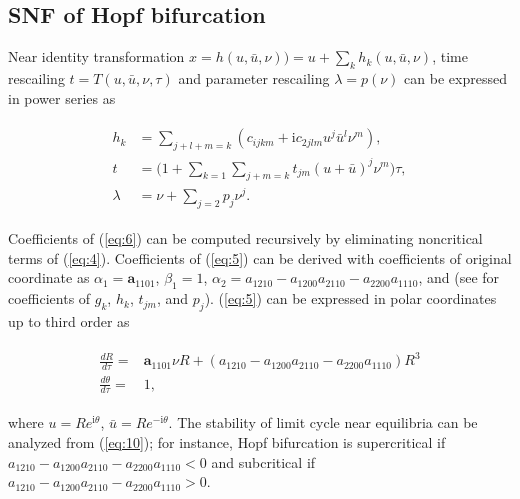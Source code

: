 \documentclass[openacc]{rsproca_new}%
\def\vec#1{\ensuremath{\mathbf{#1}}}
\newcommand{\Eref}[1]{(\ref{#1})}
\begin{document}
\begin{appendices}
\gdef\thesection{Appendix \Alph{section}}

\section{SNF of Hopf bifurcation} \label{ap0}
Near identity transformation
\(x=h(u,\bar{u},\nu))=u+\sum_k h_k(u,\bar{u},\nu)\), time rescailing \(t=T(u,\bar{u},\nu,\tau)\) and parameter rescailing \(\lambda=p(\nu)\) can be expressed in power series as

\begin{align}\label{eq:6}
  \begin{split}
    h_k &=\sum_{j+l+m=k}(c_{ijkm}+\textrm{i}c_{2jlm}u^j\bar{u}^l \nu^m),\\
    t &=\Big(1+\sum_{k=1}\sum_{j+m=k}t_{jm}(u+\bar{u})^j\nu^m\Big)\tau,\\
    \lambda &=\nu+\sum_{j=2}p_j \nu^j.
  \end{split}
\end{align}

Coefficients of \Eref{eq:6} can be computed recursively \cite{yu2002simplest} by eliminating noncritical terms of \Eref{eq:4}. Coefficients of \Eref{eq:5} can be derived with coefficients of original coordinate as $\alpha_1=\vec{a}_{1101}$, $\beta_1=1$, $\alpha_2=a_{1210}-a_{1200}a_{2110}-a_{2200}a_{1110}$, and  (see \cite{yu2002simplest} for coefficients of $g_k$, $h_k$, $t_{jm}$, and $p_j$). \Eref{eq:5} can be expressed in  polar coordinates up to third order as

\begin{align}\label{eq:10}
\begin{split}
\frac{dR}{d\tau}=&\vec{a}_{1101}\nu R+(a_{1210}-a_{1200}a_{2110}-a_{2200}a_{1110})R^3\\
\frac{d\theta}{d\tau}=&1,
\end{split}
\end{align}

\noindent where $u=Re^{\textrm{i} \theta}$, $\bar u=Re^{-\textrm{i} \theta}$. The stability of limit cycle near equilibria can be analyzed from \Eref{eq:10}; for instance, Hopf bifurcation is supercritical if \(a_{1210}-a_{1200}a_{2110}-a_{2200}a_{1110}<0\) and subcritical if \(a_{1210}-a_{1200}a_{2110}-a_{2200}a_{1110}>0\).

\end{appendices}




\end{document}
